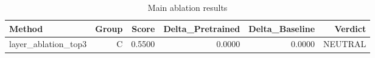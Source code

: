 \begin{table}[htbp]
\centering
\caption{Main ablation results}
\label{tab:main-results}
\begin{tabular}{lrrrrr}
\toprule
\textbf{Method} & \textbf{Group} & \textbf{Score} & \textbf{Delta\_Pretrained} & \textbf{Delta\_Baseline} & \textbf{Verdict} \\
\midrule
layer\_ablation\_top3 & C & 0.5500 & 0.0000 & 0.0000 & NEUTRAL \\
\bottomrule
\end{tabular}
\end{table}